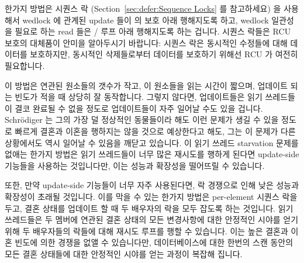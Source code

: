 한가지 방법은 시퀀스 락
(Section~\ref{sec:defer:Sequence Locks} 를 참고하세요)
을 사용해서 wedlock 에 관계된 update 들이  의 보호 아래
행해지도록 하고, wedlock 일관성을 필요로 하는 read 들은  /
 루프 아래 행해지도록 하는 겁니다.
시퀀스 락들은 RCU 보호의 대체품이 안미을 알아두시기 바랍니다:
시퀀스 락은 동시적인 수정들에 대해 데이터를 보호하지만, 동시적인 삭제들로부터
데이터를 보호하기 위해선 RCU 가 여전히 필요합니다.

이 방법은 연관된 원소들의 갯수가 작고, 이 원소들을 읽는 시간이 짧으며, 업데이트
되는 빈도가 적을 때 상당히 잘 동작합니다.
그렇지 않다면, 업데이트들은 읽기 쓰레드들이 결코 완료될 수 없을 정도로
업데이트들이 자주 일어날 수도 있을 겁니다.
Schr\"odiger 는 그의 가장 덜 정상적인 동물들이라 해도 이런 문제가 생길 수 있을
정도로 빠르게 결혼과 이혼을 행하지는 않을 것으로 예상한다고 해도, 그는 이
문제가 다른 상황에서도 역시 일어날 수 있음을 깨닫고 있습니다.
이 읽기 쓰레드 starvation 문제를 없애는 한가지 방법은 읽기 쓰레드들이 너무 많은
재시도를 행하게 된다면 update-side 기능들을 사용하는 것입니다만, 이는 성능과
확장성을 떨어뜨릴 수 있습니다.
\iffalse

One approach is to use sequence locks
(see Section~\ref{sec:defer:Sequence Locks}),
so that wedlock-related updates are carried out under the
protection of \co{write_seqlock()}, while reads requiring
wedlock consistency are carried out within
a \co{read_seqbegin()} / \co{read_seqretry()} loop.
Note that sequence locks are not a replacement for RCU protection:
Sequence locks protect against concurrent modifications, but RCU
is still needed to protect against concurrent deletions.

This approach works quite well when the number of correlated elements is
small, the time to read these elements is short, and the update rate is
low.
Otherwise, updates might happen so quickly that readers might never complete.
Although Schr\"odinger does not expect that even his least-sane relatives
will marry and divorce quickly enough for this to be a problem,
he does realize that this problem could well arise in other situations.
One way to avoid this reader-starvation problem is to have the readers
use the update-side primitives if there have been too many retries,
but this can degrade both performance and scalability.
\fi

또한, 만약 update-side 기능들이 너무 자주 사용된다면, 락 경쟁으로 인해 낮은
성능과 확장성이 초래될 것입니다.
이를 막을 수 있는 한가지 방법은 per-element 시퀀스 락을 두고, 결혼 상태를
업데이트 할 때 두 배우자의 락을 모두 잡도록 하는 것입니다.
읽기 쓰레드들은 두 멤버에 연관된 결혼 상태의 모든 변경사항에 대한 안정적인
시야를 얻기 위해 두 배우자들의 락들에 대해 재시도 루프를 행할 수 있습니다.
이는 높은 결혼과 이혼 빈도에 의한 경쟁을 없앨 수 있습니다만, 데이터베이스에
대한 한번의 스캔 동안의 모든 결혼 상태들에 대한 안정적인 시야를 얻는 과정이
복잡해 집니다.
\iffalse

